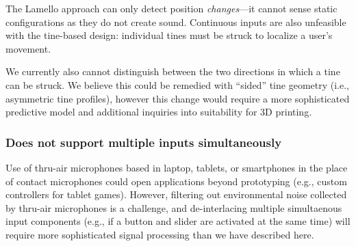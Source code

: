    The Lamello approach can only detect position \emph{changes}---it cannot sense static configurations as they do not create sound. Continuous inputs are also unfeasible with the tine-based design: individual tines must be struck to localize a user's movement.
    
    We currently also cannot distinguish between the two directions in which a tine can be struck. We believe this could be remedied with ``sided'' tine geometry (i.e., asymmetric tine profiles), however this change would require a more sophisticated predictive model and additional inquiries into suitability for 3D printing.
    
    \subsubsection{Does not support multiple inputs simultaneously}
    Use of thru-air microphones based in laptop, tablets, or smartphones in the place of contact microphones could open applications beyond prototyping (e.g., custom controllers for tablet games). However, filtering out environmental noise collected by thru-air microphones is a challenge, and de-interlacing multiple simultaenous input components (e.g., if a button and slider are activated at the same time) will require more sophisticated signal processing than we have described here.